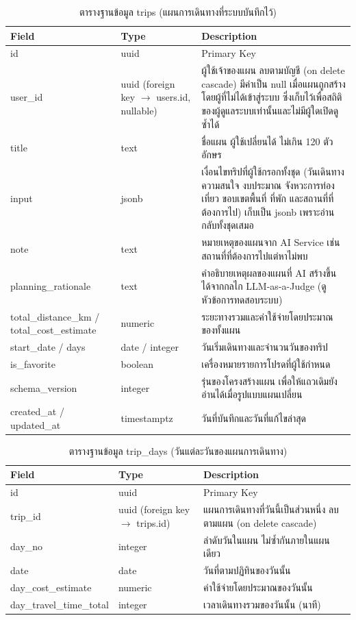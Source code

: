 \begin{table}[H]
\centering
\caption{ตารางฐานข้อมูล trips (แผนการเดินทางที่ระบบบันทึกไว้)}
\label{tab:db_trips}
\begin{tabular}{|p{3.6cm}|p{2.6cm}|p{6.8cm}|}
\hline
\textbf{Field} & \textbf{Type} & \textbf{Description} \\
\hline
id & uuid & Primary Key \\ \hline
user\_id & uuid (foreign key $\to$ users.id, nullable) & ผู้ใช้เจ้าของแผน ลบตามบัญชี (on delete cascade) มีค่าเป็น null เมื่อแผนถูกสร้างโดยผู้ที่ไม่ได้เข้าสู่ระบบ ซึ่งเก็บไว้เพื่อสถิติของผู้ดูแลระบบเท่านั้นและไม่มีผู้ใดเปิดดูซ้ำได้ \\ \hline
title & text & ชื่อแผน ผู้ใช้เปลี่ยนได้ ไม่เกิน 120 ตัวอักษร \\ \hline
input & jsonb & เงื่อนไขทริปที่ผู้ใช้กรอกทั้งชุด (วันเดินทาง ความสนใจ งบประมาณ จังหวะการท่องเที่ยว ขอบเขตพื้นที่ ที่พัก และสถานที่ที่ต้องการไป) เก็บเป็น jsonb เพราะอ่านกลับทั้งชุดเสมอ \\ \hline
note & text & หมายเหตุของแผนจาก AI Service เช่น สถานที่ที่ต้องการไปแต่หาไม่พบ \\ \hline
planning\_rationale & text & คำอธิบายเหตุผลของแผนที่ AI สร้างขึ้น ได้จากกลไก LLM-as-a-Judge (ดูหัวข้อการทดสอบระบบ) \\ \hline
total\_distance\_km / total\_cost\_estimate & numeric & ระยะทางรวมและค่าใช้จ่ายโดยประมาณของทั้งแผน \\ \hline
start\_date / days & date / integer & วันเริ่มเดินทางและจำนวนวันของทริป \\ \hline
is\_favorite & boolean & เครื่องหมายรายการโปรดที่ผู้ใช้กำหนด \\ \hline
schema\_version & integer & รุ่นของโครงสร้างแผน เพื่อให้แถวเดิมยังอ่านได้เมื่อรูปแบบแผนเปลี่ยน \\ \hline
created\_at / updated\_at & timestamptz & วันที่บันทึกและวันที่แก้ไขล่าสุด \\
\hline
\end{tabular}
\end{table}

\begin{table}[H]
\centering
\caption{ตารางฐานข้อมูล trip\_days (วันแต่ละวันของแผนการเดินทาง)}
\label{tab:db_tripdays}
\begin{tabular}{|p{3.6cm}|p{2.6cm}|p{6.8cm}|}
\hline
\textbf{Field} & \textbf{Type} & \textbf{Description} \\
\hline
id & uuid & Primary Key \\ \hline
trip\_id & uuid (foreign key $\to$ trips.id) & แผนการเดินทางที่วันนี้เป็นส่วนหนึ่ง ลบตามแผน (on delete cascade) \\ \hline
day\_no & integer & ลำดับวันในแผน ไม่ซ้ำกันภายในแผนเดียว \\ \hline
date & date & วันที่ตามปฏิทินของวันนั้น \\ \hline
day\_cost\_estimate & numeric & ค่าใช้จ่ายโดยประมาณของวันนั้น \\ \hline
day\_travel\_\allowbreak time\_total & integer & เวลาเดินทางรวมของวันนั้น (นาที) \\
\hline
\end{tabular}
\end{table}

